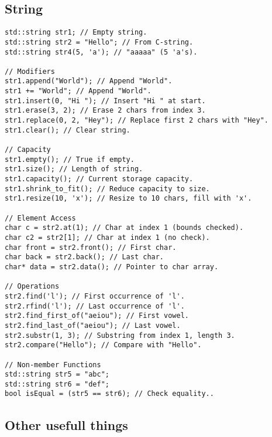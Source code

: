 \subsection{String}

\begin{lstlisting}[style=codeexpert]
std::string str1; // Empty string.
std::string str2 = "Hello"; // From C-string.
std::string str4(5, 'a'); // "aaaaa" (5 'a's).

// Modifiers
str1.append("World"); // Append "World".
str1 += "World"; // Append "World".
str1.insert(0, "Hi "); // Insert "Hi " at start.
str1.erase(3, 2); // Erase 2 chars from index 3.
str1.replace(0, 2, "Hey"); // Replace first 2 chars with "Hey".
str1.clear(); // Clear string.

// Capacity
str1.empty(); // True if empty.
str1.size(); // Length of string.
str1.capacity(); // Current storage capacity.
str1.shrink_to_fit(); // Reduce capacity to size.
str1.resize(10, 'x'); // Resize to 10 chars, fill with 'x'.

// Element Access
char c = str2.at(1); // Char at index 1 (bounds checked).
char c2 = str2[1]; // Char at index 1 (no check).
char front = str2.front(); // First char.
char back = str2.back(); // Last char.
char* data = str2.data(); // Pointer to char array.

// Operations
str2.find('l'); // First occurrence of 'l'.
str2.rfind('l'); // Last occurrence of 'l'.
str2.find_first_of("aeiou"); // First vowel.
str2.find_last_of("aeiou"); // Last vowel.
str2.substr(1, 3); // Substring from index 1, length 3.
str2.compare("Hello"); // Compare with "Hello".

// Non-member Functions
std::string str5 = "abc";
std::string str6 = "def";
bool isEqual = (str5 == str6); // Check equality..
\end{lstlisting}

\subsection{Other usefull things}

